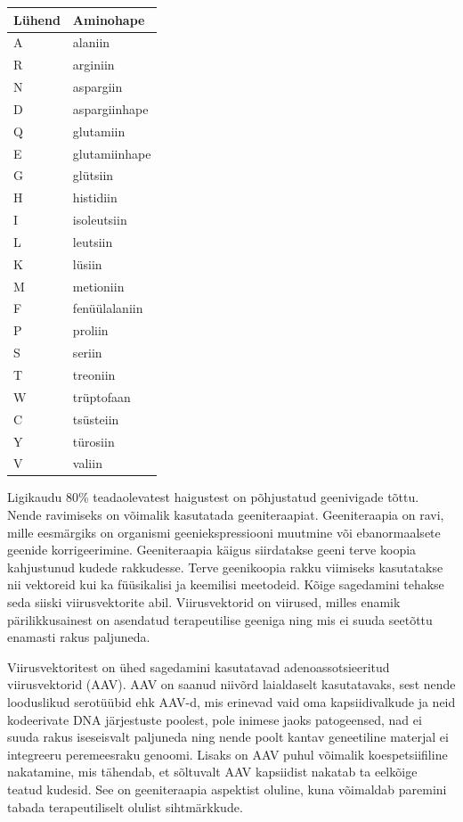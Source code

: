 \documentclass{trkut}%
\begin{document}
	\begin{tabular}{p{2cm} p{3cm}}
		Lühend & Aminohape \\
		\hline
		A & alaniin \\
		R & arginiin \\
		N & aspargiin \\
		D & aspargiinhape\\
		Q & glutamiin \\
		E & glutamiinhape \\
		G & glütsiin \\
		H & histidiin \\
		I & isoleutsiin \\
		L & leutsiin \\
		K & lüsiin \\
		M & metioniin \\
		F & fenüülalaniin \\
		P & proliin \\
		S & seriin \\
		T & treoniin \\
		W & trüptofaan \\
		C & tsüsteiin \\
		Y & türosiin \\
		V & valiin \\
		
	\end{tabular}

\setcounter{table}{0}

\setlength\tabcolsep{6 pt}


\nummerdame
\pagestyle{plain}

Ligikaudu 80\% teadaolevatest haigustest on põhjustatud geenivigade tõttu. Nende ravimiseks on võimalik kasutatada geeniteraapiat. Geeniteraapia on ravi, mille eesmärgiks on organismi geeniekspressiooni muutmine või ebanormaalsete geenide korrigeerimine. Geeniteraapia käigus siirdatakse geeni terve koopia kahjustunud kudede rakkudesse. Terve geenikoopia rakku viimiseks kasutatakse nii vektoreid kui ka füüsikalisi ja keemilisi meetodeid. Kõige sagedamini tehakse seda siiski viirusvektorite abil. Viirusvektorid on viirused, milles enamik pärilikkusainest on asendatud terapeutilise geeniga ning mis ei suuda seetõttu enamasti rakus paljuneda. 

Viirusvektoritest on ühed sagedamini kasutatavad adenoassotsieeritud viirusvektorid (AAV). AAV on saanud niivõrd laialdaselt kasutatavaks, sest nende looduslikud serotüübid ehk AAV-d, mis erinevad vaid oma kapsiidivalkude ja neid kodeerivate DNA järjestuste poolest, pole inimese jaoks patogeensed, nad ei suuda rakus iseseisvalt paljuneda ning nende poolt kantav geneetiline materjal ei integreeru peremeesraku genoomi. Lisaks on AAV puhul võimalik koespetsiifiline nakatamine, mis tähendab, et sõltuvalt AAV kapsiidist nakatab ta eelkõige teatud kudesid. See on geeniteraapia aspektist oluline, kuna võimaldab paremini tabada terapeutiliselt olulist sihtmärkkude.
\end{document}

